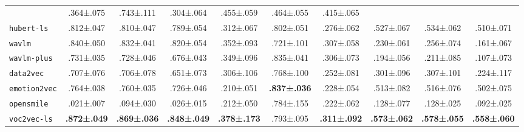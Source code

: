 \begin{table*}[]
\begin{tabular}{l|ccc|ccc|ccc}
    & .364\scriptsize±.075 
    & .743\scriptsize±.111 
    & .304\scriptsize±.064 
    & .455\scriptsize±.059 
    & .464\scriptsize±.055 
    & .415\scriptsize±.065 \\
\texttt{hubert-ls} 
    & .812\scriptsize±.047 
    & .810\scriptsize±.047 
    & .789\scriptsize±.054 
    & .312\scriptsize±.067 
    & .802\scriptsize±.051 
    & .276\scriptsize±.062 
    & .527\scriptsize±.067 
    & .534\scriptsize±.062 
    & .510\scriptsize±.071 \\
\texttt{wavlm}
    & .840\scriptsize±.050
    & .832\scriptsize±.041 
    & .820\scriptsize±.054 
    & .352\scriptsize±.093 
    & .721\scriptsize±.101 
    & .307\scriptsize±.058 
    & .230\scriptsize±.061 
    & .256\scriptsize±.074 
    & .161\scriptsize±.067 \\
\texttt{wavlm-plus} 
    & .731\scriptsize±.035
    & .728\scriptsize±.046 
    & .676\scriptsize±.043 
    & .349\scriptsize±.096 
    & .835\scriptsize±.041 
    & .306\scriptsize±.073 
    & .194\scriptsize±.056 
    & .211\scriptsize±.085 
    & .107\scriptsize±.073 \\
\texttt{data2vec} 
    & .707\scriptsize±.076 
    & .706\scriptsize±.078 
    & .651\scriptsize±.073 
    & .306\scriptsize±.106 
    & .768\scriptsize±.100 
    & .252\scriptsize±.081 
    & .301\scriptsize±.096 
    & .307\scriptsize±.101 
    & .224\scriptsize±.117 \\
\texttt{emotion2vec} 
    & .764\scriptsize±.038 
    & .760\scriptsize±.035
    & .726\scriptsize±.046 
    & .210\scriptsize±.051 
    & \cellcolor[HTML]{D9EAD3}\textbf{.837\scriptsize±.036} 
    & .228\scriptsize±.054 
    & .513\scriptsize±.082 
    & .516\scriptsize±.076 
    & .502\scriptsize±.075 \\
\texttt{opensmile} 
    & .021\scriptsize±.007 
    & .094\scriptsize±.030 
    & .026\scriptsize±.015 
    & .212\scriptsize±.050 
    & .784\scriptsize±.155 
    & .222\scriptsize±.062 
    & .128\scriptsize±.077 
    & .128\scriptsize±.025 
    & .092\scriptsize±.025 \\
\texttt{voc2vec-ls} 
    & \cellcolor[HTML]{D9EAD3}\textbf{.872\scriptsize±.049} 
    & \cellcolor[HTML]{D9EAD3}\textbf{.869\scriptsize±.036} 
    & \cellcolor[HTML]{D9EAD3}\textbf{.848\scriptsize±.049} 
    & \cellcolor[HTML]{D9EAD3}\textbf{.378\scriptsize±.173} 
    & .793\scriptsize±.095 
    & \cellcolor[HTML]{D9EAD3}\textbf{.311\scriptsize±.092} 
    & \cellcolor[HTML]{D9EAD3}\textbf{.573\scriptsize±.062} 
    & \cellcolor[HTML]{D9EAD3}\textbf{.578\scriptsize±.055} 
    & \cellcolor[HTML]{D9EAD3}\textbf{.558\scriptsize±.060} \\
\bottomrule
\end{tabular}
\end{table*}